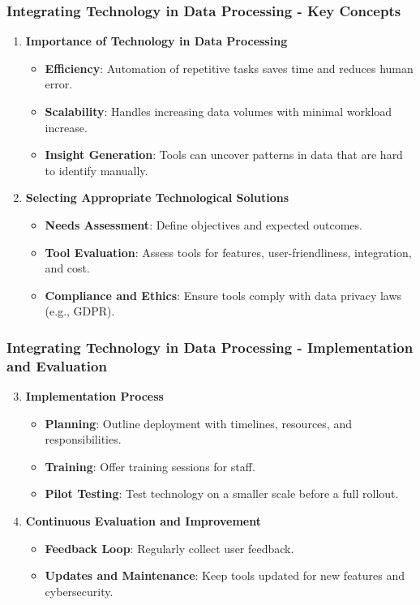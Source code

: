 \documentclass[aspectratio=169]{beamer}
\begin{document}
\begin{frame}[fragile]
    \frametitle{Integrating Technology in Data Processing - Key Concepts}
    \begin{enumerate}
        \item \textbf{Importance of Technology in Data Processing}
            \begin{itemize}
                \item \textbf{Efficiency}: Automation of repetitive tasks saves time and reduces human error.
                \item \textbf{Scalability}: Handles increasing data volumes with minimal workload increase.
                \item \textbf{Insight Generation}: Tools can uncover patterns in data that are hard to identify manually.
            \end{itemize}
        \item \textbf{Selecting Appropriate Technological Solutions}
            \begin{itemize}
                \item \textbf{Needs Assessment}: Define objectives and expected outcomes.
                \item \textbf{Tool Evaluation}: Assess tools for features, user-friendliness, integration, and cost.
                \item \textbf{Compliance and Ethics}: Ensure tools comply with data privacy laws (e.g., GDPR).
            \end{itemize}
    \end{enumerate}
\end{frame}

\begin{frame}[fragile]
    \frametitle{Integrating Technology in Data Processing - Implementation and Evaluation}
    \begin{enumerate}
        \setcounter{enumi}{2}
        \item \textbf{Implementation Process}
            \begin{itemize}
                \item \textbf{Planning}: Outline deployment with timelines, resources, and responsibilities.
                \item \textbf{Training}: Offer training sessions for staff.
                \item \textbf{Pilot Testing}: Test technology on a smaller scale before a full rollout.
            \end{itemize}
        \item \textbf{Continuous Evaluation and Improvement}
            \begin{itemize}
                \item \textbf{Feedback Loop}: Regularly collect user feedback.
                \item \textbf{Updates and Maintenance}: Keep tools updated for new features and cybersecurity.
            \end{itemize}
    \end{enumerate}
\end{frame}
\end{document}
